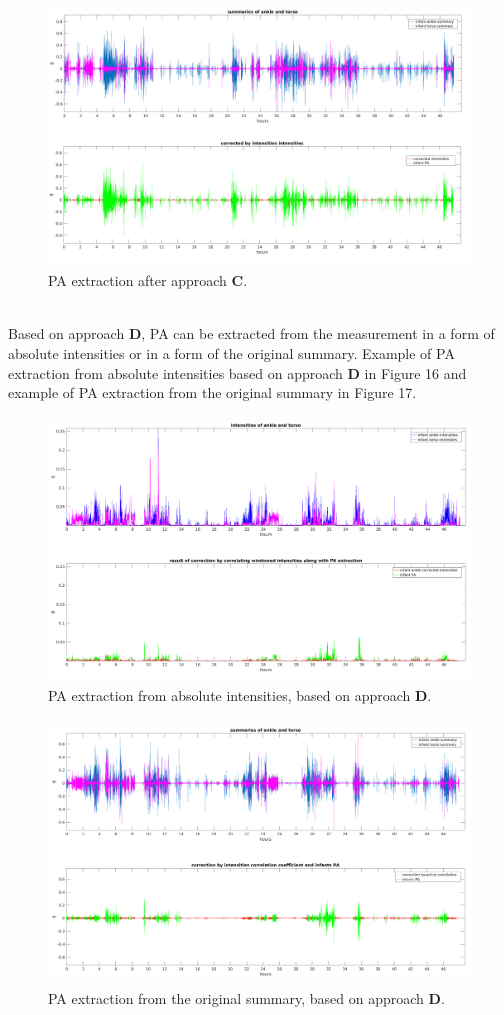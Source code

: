 \documentclass{article}
\begin{document}
{\begin{figure}[h]
\includegraphics[width=15cm, height=7cm]{CorrectedIntensitiesPA.png}
\caption{PA extraction after approach \textbf{C}.}
\end{figure}
\\
Based on approach \textbf{D}, PA can be extracted from the measurement in a form of absolute intensities or in a form of the original summary. Example of PA extraction from absolute intensities based on approach \textbf{D} in Figure 16 and example of PA extraction from the original summary in Figure 17. 

\begin{figure}[h]
\includegraphics[width=15cm, height=7cm]{CorrectedIntensitiesCorrelationResultPA.png}
\caption{PA extraction from absolute intensities, based on approach \textbf{D}.}
\end{figure}

\begin{figure}[h]
\includegraphics[width=15cm, height=7cm]{CorrectedCorrelationResultPA.png}
\caption{PA extraction from the original summary, based on approach \textbf{D}.}
\end{figure}

}
\end{document}
